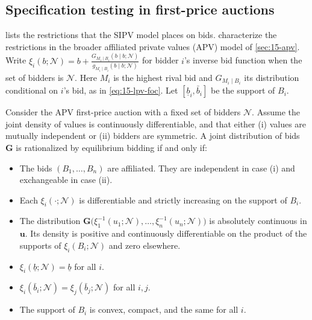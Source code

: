 \subsection{Specification testing in first-price auctions}\label{sec:15-gpv-tests}

 lists the restrictions that the SIPV model places on bids.  characterize the restrictions in the broader affiliated private values (APV) model of \cref{sec:15-apv}. Write $\xi_i(b;\mathcal N)=b+\frac{G_{M_i\mid B_i}(b\mid b;\mathcal N)}{g_{M_i\mid B_i}(b\mid b;\mathcal N)}$ for bidder $i$'s inverse bid function when the set of bidders is $\mathcal N$. Here $M_i$ is the highest rival bid and $G_{M_i\mid B_i}$ its distribution conditional on $i$'s bid, as in \eqref{eq:15-lpv-foc}. Let $[\underline b_i,\bar b_i]$ be the support of $B_i$.

\begin{theorem}\label{thm:15-ah-rational}
Consider the APV first-price auction with a fixed set of bidders $\mathcal N$. Assume the joint density of values is continuously differentiable, and that either (i) values are mutually independent or (ii) bidders are symmetric. A joint distribution of bids $\mathbf G$ is rationalized by equilibrium bidding if and only if:
\begin{itemize}
\item[(a)] The bids $(B_1,\dots,B_n)$ are affiliated. They are independent in case (i) and exchangeable in case (ii).
\item[(b)] Each $\xi_i(\cdot;\mathcal N)$ is differentiable and strictly increasing on the support of $B_i$.
\item[(c)] The distribution $\mathbf G\big(\xi_1^{-1}(u_1;\mathcal N),\dots,\xi_n^{-1}(u_n;\mathcal N)\big)$ is absolutely continuous in $\bm u$. Its density is positive and continuously differentiable on the product of the supports of $\xi_i(B_i;\mathcal N)$ and zero elsewhere.
\item[(d)] $\xi_i(\underline b;\mathcal N)=\underline b$ for all $i$.
\item[(e)] $\xi_i(\bar b_i;\mathcal N)=\xi_j(\bar b_j;\mathcal N)$ for all $i,j$.
\item[(f)] The support of $B_i$ is convex, compact, and the same for all $i$.
\end{itemize}
\end{theorem}

